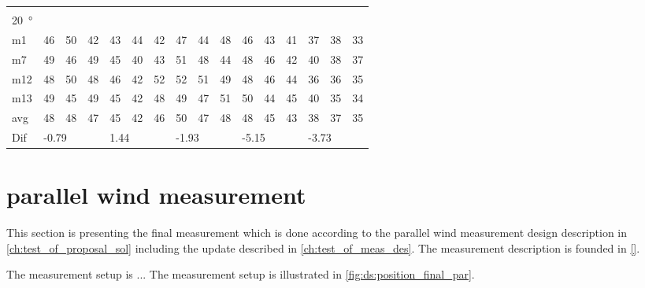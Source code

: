 \begin{table}[H]
\begin{tabular}{l|l|l|l|l|l|l|l|l|l|l|l|l|lll}
 \multicolumn{16}{l}{ } \\                             
\SI{20}{\degree}   & \multicolumn{3}{l|}{} & \multicolumn{3}{l|}{} & \multicolumn{3}{l|}{} & \multicolumn{3}{l|}{} & \multicolumn{3}{l}{}   \\  \hline
m1    &46      &  50    &  42    &   43   &  44    &  42    &  47    &   44    &  48    &    46   &  43    &  41    & \multicolumn{1}{l|}{37} & \multicolumn{1}{l|}{38} &33  \\
m7    & 49     &  46    &  49    &   45   &  40    &   43   &   51   &   48    &  44    &    48   & 46     &  42    & \multicolumn{1}{l|}{40} & \multicolumn{1}{l|}{38} &37  \\
m12  & 48     &  50    &  48    &  46    &  42    &   52   &   52   &   51    &   49   &   48    &  46    & 44     & \multicolumn{1}{l|}{36} & \multicolumn{1}{l|}{36} & 35 \\
m13  &  49    &  45    &  49    &  45    &  42    &   48   &   49   &   47    &  51    &   50    &  44    &  45    & \multicolumn{1}{l|}{40} & \multicolumn{1}{l|}{35} & 34 \\ \hline
avg &  48    & 48     &   47   &  45    & 42     &  46    &  50    &  47     &  48    &  48     &   45   & 43     & \multicolumn{1}{l|}{38} & \multicolumn{1}{l|}{37}  &35  \\ \hline  
Dif & \multicolumn{3}{l|}{-0.79} & \multicolumn{3}{l|}{1.44} & \multicolumn{3}{l|}{-1.93} & \multicolumn{3}{l|}{-5.15} & \multicolumn{3}{l}{-3.73}                                
\end{tabular}
\end{table}

\section{parallel wind measurement}\label{mes:kudo:par_mes}
This section is presenting the final measurement which is done according to the parallel wind measurement design description in \autoref{ch:test_of_proposal_sol} including the update described in \autoref{ch:test_of_meas_des}. The measurement description is founded in \autoref{}. 


The measurement setup is ... The measurement setup is illustrated in \autoref{fig:ds:position_final_par}.


